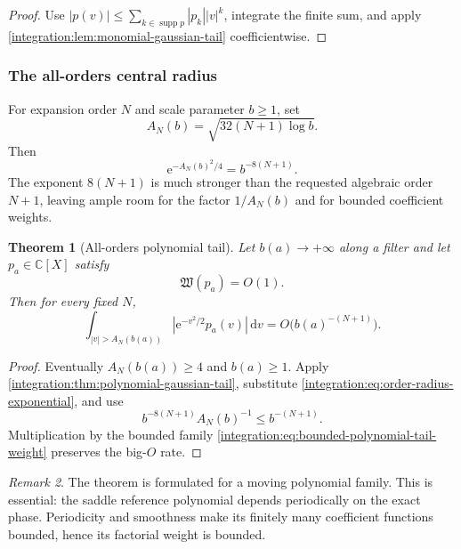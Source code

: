 \documentclass[11pt,oneside]{article}
\newtheorem{theorem}{Theorem}[section]
\theoremstyle{definition}
\theoremstyle{remark}
\newtheorem{remark}[theorem]{Remark}
\newcommand{\C}{\mathbb C}
\newcommand{\e}{\mathrm e}
\newcommand{\dd}{\,\mathrm d}
\newcommand{\supp}{\operatorname{supp}}
\begin{document}
\begin{proof}
Use
$|p(v)|\le\sum_{k\in\supp p}|p_k||v|^k$, integrate the finite sum, and apply
\cref{integration:lem:monomial-gaussian-tail} coefficientwise.
\end{proof}

\subsubsection{The all-orders central radius}

For expansion order $N$ and scale parameter $b\ge1$, set
\begin{equation}
 A_N(b)=\sqrt{32(N+1)\log b}.
 \label{integration:eq:order-central-radius}
\end{equation}
Then
\begin{equation}
 \e^{-A_N(b)^2/4}=b^{-8(N+1)}.
 \label{integration:eq:order-radius-exponential}
\end{equation}
The exponent $8(N+1)$ is much stronger than the requested algebraic order $N+1$, leaving
ample room for the factor $1/A_N(b)$ and for bounded coefficient weights.

\begin{theorem}[All-orders polynomial tail]
\label{integration:thm:all-orders-polynomial-tail}
Let $b(a)\to+\infty$ along a filter and let $p_a\in\C[X]$ satisfy
\begin{equation}
 \mathfrak W(p_a)=O(1).
 \label{integration:eq:bounded-polynomial-tail-weight}
\end{equation}
Then for every fixed $N$,
\begin{equation}
 \int_{|v|>A_N(b(a))}
 \left|\e^{-v^2/2}p_a(v)\right|\dd v
 =O\bigl(b(a)^{-(N+1)}\bigr).
 \label{integration:eq:all-orders-polynomial-tail}
\end{equation}
\end{theorem}

\begin{proof}
Eventually $A_N(b(a))\ge4$ and $b(a)\ge1$.  Apply
\cref{integration:thm:polynomial-gaussian-tail}, substitute
\eqref{integration:eq:order-radius-exponential}, and use
\[
 b^{-8(N+1)}A_N(b)^{-1}\le b^{-(N+1)}.
\]
Multiplication by the bounded family \eqref{integration:eq:bounded-polynomial-tail-weight} preserves the
big-$O$ rate.
\end{proof}

\begin{remark}
The theorem is formulated for a moving polynomial family.  This is essential: the saddle
reference polynomial depends periodically on the exact phase.  Periodicity and smoothness
make its finitely many coefficient functions bounded, hence its factorial weight is bounded.
\end{remark}
\end{document}
